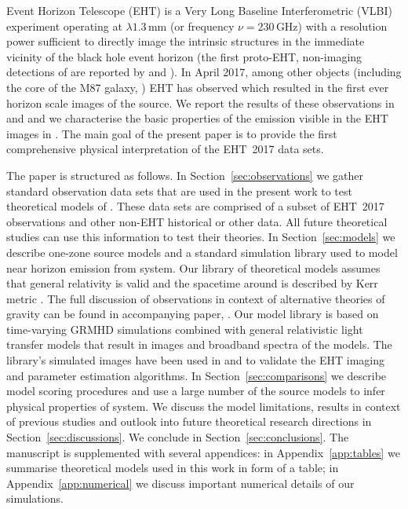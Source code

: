 Event Horizon Telescope (EHT) is a Very Long Baseline Interferometric (VLBI) experiment
operating at $\lambda1.3$\,mm (or frequency $\nu=230$\,GHz)
with a resolution power sufficient to directly image the intrinsic \sgra structures in the immediate vicinity of the black hole event horizon (the first proto-EHT, non-imaging detections of \sgra are reported by \citealt{2008Natur.455...78D, 2015Sci...350.1242J} and \citealt{2018ApJ...859...60L}). In April 2017, among other objects (including the core of the M87 galaxy, ) EHT has observed \sgra which resulted in the first ever horizon scale images of the source. We report the results of these observations in  and  and we characterise the basic properties of the emission visible in the EHT images in . The main goal of the present paper  is to provide the first comprehensive physical interpretation of the EHT~2017 \sgra data sets.

The paper is structured as follows. In Section~\ref{sec:observations} we gather standard observation data sets that are used in the present work to test theoretical models of \sgra. These data sets are comprised of a subset of EHT~2017 observations and other non-EHT historical or other data. All future theoretical studies can use this information to test their theories. In Section~\ref{sec:models} we describe one-zone source models and a standard simulation library used to model near horizon emission from \sgra system. Our library of theoretical models assumes that general relativity is valid and the spacetime around \sgra is described by Kerr metric \citep{1963PhRvL..11..237K}. The full discussion of \sgra observations in context of alternative theories of gravity can be found in accompanying paper, .
Our model library is based on time-varying GRMHD simulations combined with general relativistic light transfer models that result in images and broadband spectra of the models. The library's simulated images have been used in  and  to validate the \sgra EHT imaging and parameter estimation algorithms.
In Section~\ref{sec:comparisons} we describe model scoring procedures and use a large number of the source models to infer physical properties of \sgra system. We discuss the model limitations, results in context of previous studies and outlook into future \sgra theoretical research directions in Section~\ref{sec:discussions}. We conclude in Section~\ref{sec:conclusions}.
The manuscript is supplemented with several appendices: in Appendix~\ref{app:tables} we summarise theoretical models used in this work in form of a table; in Appendix~\ref{app:numerical} we discuss important numerical details of our simulations.
